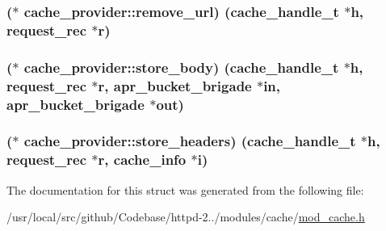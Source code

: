 \subsubsection[{\texorpdfstring{remove\+\_\+url}{remove_url}}]{($\ast$ cache\+\_\+provider\+::remove\+\_\+url) ({\bf cache\+\_\+handle\+\_\+t} $\ast${\bf h}, {\bf request\+\_\+rec} $\ast${\bf r})}\hypertarget{structcache__provider_a82d8c41dcf037abc2cfbe6eb3706463a}{}\label{structcache__provider_a82d8c41dcf037abc2cfbe6eb3706463a}
\subsubsection[{\texorpdfstring{store\+\_\+body}{store_body}}]{($\ast$ cache\+\_\+provider\+::store\+\_\+body) ({\bf cache\+\_\+handle\+\_\+t} $\ast${\bf h}, {\bf request\+\_\+rec} $\ast${\bf r}, {\bf apr\+\_\+bucket\+\_\+brigade} $\ast${\bf in}, {\bf apr\+\_\+bucket\+\_\+brigade} $\ast${\bf out})}\hypertarget{structcache__provider_a8358c039ec77965944f51b6e9d454e6b}{}\label{structcache__provider_a8358c039ec77965944f51b6e9d454e6b}
\subsubsection[{\texorpdfstring{store\+\_\+headers}{store_headers}}]{($\ast$ cache\+\_\+provider\+::store\+\_\+headers) ({\bf cache\+\_\+handle\+\_\+t} $\ast${\bf h}, {\bf request\+\_\+rec} $\ast${\bf r}, {\bf cache\+\_\+info} $\ast${\bf i})}\hypertarget{structcache__provider_ad08027697ec09826ae214266de0a243f}{}\label{structcache__provider_ad08027697ec09826ae214266de0a243f}


The documentation for this struct was generated from the following file\+:\begin{DoxyCompactItemize}
\item 
/usr/local/src/github/\+Codebase/httpd-\/2../modules/cache/\hyperlink{mod__cache_8h}{mod\+\_\+cache.\+h}\end{DoxyCompactItemize}
